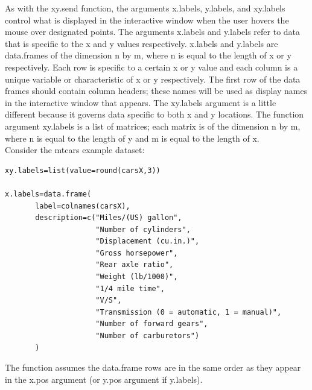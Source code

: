 \documentclass[]{article}
\begin{document}
\indent As with the xy.send function, the arguments x.labels, y.labels, and xy.labels control what is displayed in the interactive window when the user hovers the mouse over designated points. The arguments x.labels and y.labels refer to data that is specific to the x and y values respectively. x.labels and y.labels are data.frames of the dimension n by m, where n is equal to the length of x or y respectively. Each row is specific to a certain x or y value and each column is a unique variable or characteristic of x or y respectively.  The first row of the data frames should contain column headers; these names will be used as display names in the interactive window that appears. The xy.labels argument is a little different because it governs data specific to both x and y locations. The function argument xy.labels is a list of matrices; each matrix is of the dimension n by m, where n is equal to the length of y and m is equal to the length of x.\\ 

\indent Consider the mtcars example dataset:

\begin{verbatim}
xy.labels=list(value=round(carsX,3))

x.labels=data.frame(
       label=colnames(carsX),
       description=c("Miles/(US) gallon",
                     "Number of cylinders",
                     "Displacement (cu.in.)",
                     "Gross horsepower",
                     "Rear axle ratio",
                     "Weight (lb/1000)",
                     "1/4 mile time",
                     "V/S",
                     "Transmission (0 = automatic, 1 = manual)",
                     "Number of forward gears",
                     "Number of carburetors")
       )

\end{verbatim}


 The function assumes the data.frame rows are in the same order as they appear in the x.pos argument (or y.pos argument if y.labels).  \newline
\end{document}
